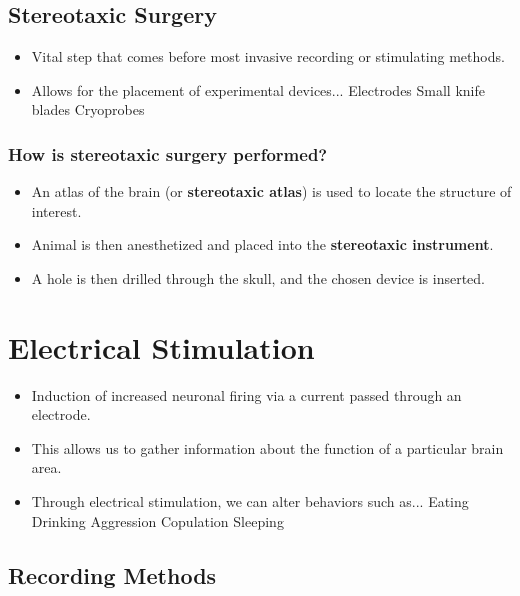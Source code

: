 \documentclass[12pt,a4paper]{article}
\begin{document}
	\subsection{Stereotaxic Surgery}
	
	\begin{itemize}
		\item Vital step that comes before most invasive recording or stimulating methods. 
		\item Allows for the placement of experimental devices... 
		\subitem Electrodes 
		\subitem Small knife blades 
		\subitem Cryoprobes 
	\end{itemize}
	
	\subsubsection{How is stereotaxic surgery performed?}
	
	\begin{itemize}
		\item An atlas of the brain (or \textbf{stereotaxic atlas}) is used to locate the structure of interest. 
		\item Animal is then anesthetized and placed into the \textbf{stereotaxic instrument}. 
		\item A hole is then drilled through the skull, and the chosen device is inserted. 
	\end{itemize}
	
	\section{Electrical Stimulation}
	
	\begin{itemize}
		\item Induction of increased neuronal firing via a current passed through an electrode. 
		\item This allows us to gather information about the function of a particular brain area. 
		\item Through electrical stimulation, we can alter behaviors such as...
		\subitem Eating 
		\subitem Drinking 
		\subitem Aggression 
		\subitem Copulation 
		\subitem Sleeping 
	\end{itemize}
	
	\subsection{Recording Methods}
	
\end{document}

